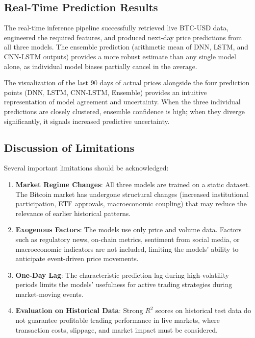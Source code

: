 \documentclass[12pt]{article}
\begin{document}
\subsection{Real-Time Prediction Results}

The real-time inference pipeline successfully retrieved live BTC-USD data, engineered the required features, and produced next-day price predictions from all three models. The ensemble prediction (arithmetic mean of DNN, LSTM, and CNN-LSTM outputs) provides a more robust estimate than any single model alone, as individual model biases partially cancel in the average.

The visualization of the last 90 days of actual prices alongside the four prediction points (DNN, LSTM, CNN-LSTM, Ensemble) provides an intuitive representation of model agreement and uncertainty. When the three individual predictions are closely clustered, ensemble confidence is high; when they diverge significantly, it signals increased predictive uncertainty.

\subsection{Discussion of Limitations}

Several important limitations should be acknowledged:

\begin{enumerate}[leftmargin=*]
    \item \textbf{Market Regime Changes}: All three models are trained on a static dataset. The Bitcoin market has undergone structural changes (increased institutional participation, ETF approvals, macroeconomic coupling) that may reduce the relevance of earlier historical patterns.
    \item \textbf{Exogenous Factors}: The models use only price and volume data. Factors such as regulatory news, on-chain metrics, sentiment from social media, or macroeconomic indicators are not included, limiting the models' ability to anticipate event-driven price movements.
    \item \textbf{One-Day Lag}: The characteristic prediction lag during high-volatility periods limits the models' usefulness for active trading strategies during market-moving events.
    \item \textbf{Evaluation on Historical Data}: Strong $R^2$ scores on historical test data do not guarantee profitable trading performance in live markets, where transaction costs, slippage, and market impact must be considered.
\end{enumerate}
\end{document}
